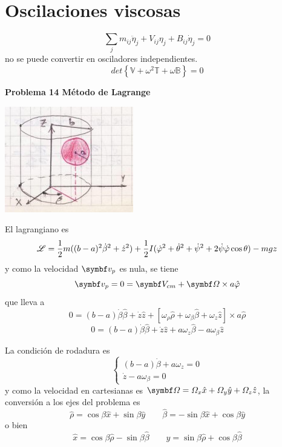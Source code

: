 \documentclass[10pt,oneside]{CBFT_book}
\begin{document}
\section{Oscilaciones viscosas}

\[
	\sum_j m_{ij} \ddot{\eta}_j + V_{ij}\eta_j + B_{ij}\dot{\eta}_j = 0
\]
no se puede convertir en osciladores independientes.
\[
	det\left\{ \mathbb{V} + \omega^2 \mathbb{T} + \omega \mathbb{B}\right\} = 0
\]


\begin{ejemplo}{\bf Problema 14 Método de Lagrange}

\includegraphics[scale=0.5]{images/fig_mc_lagrangebola_1.jpg}

El lagrangiano es
\[
	\mathscr{L} = \frac 1 2 m ( (b-a)^2 \dot{\beta}^2 + \dot{z}^2 ) + 
	\frac 1 2 I ( \dot{\varphi}^2 + \dot{\theta}^2 + \dot{\psi}^2 + 2 \dot{\psi} \dot{\varphi} \cos\theta ) 
	- m g z
\]
y como la velocidad $ \vb{v}_p $ es nula, se tiene 
\[
	\vb{v}_p = 0 = \vb{V}_{cm} + \vb{\Omega} \times a \hat{\vp}
\]
que lleva a
\[
	0 = (b-a)\dot{\beta}\hat{\beta} + \dot{z}\hat{z} +
	[\omega_\rho\hat{\rho} + \omega_\beta\hat{\beta} + \omega_z\hat{z} ]\times a\hat{\rho}
\]
\[
	0 = (b-a)\dot{\beta}\hat{\beta} + \dot{z}\hat{z} + a\omega_z\hat{\beta} - a\omega_\beta\hat{z} 
\]

La condición de rodadura es
\[
	\begin{cases}
	 (b-a)\dot{\beta} + a \omega_z = 0 \\
	 \dot{z} - a \omega_\beta = 0
	\end{cases}
\]
y como la velocidad en cartesianas es $ \vb{\Omega} = \Omega_x \hat{x} + \Omega_y \hat{y} + \Omega_z \hat{z} $,
la conversión a los ejes del problema es
\[
	\hat{\rho} = \cos \beta \hat{x} + \sin \beta \hat{y} \qquad 
	\hat{\beta} = -\sin \beta \hat{x} + \cos \beta \hat{y}
\]
o bien
\[
	\hat{x} = \cos \beta \hat{\rho} - \sin \beta \hat{\beta} \qquad 
	\hat{y} = \sin \beta \hat{\rho} + \cos \beta \hat{\beta}

\]
\end{ejemplo}
\end{document}
